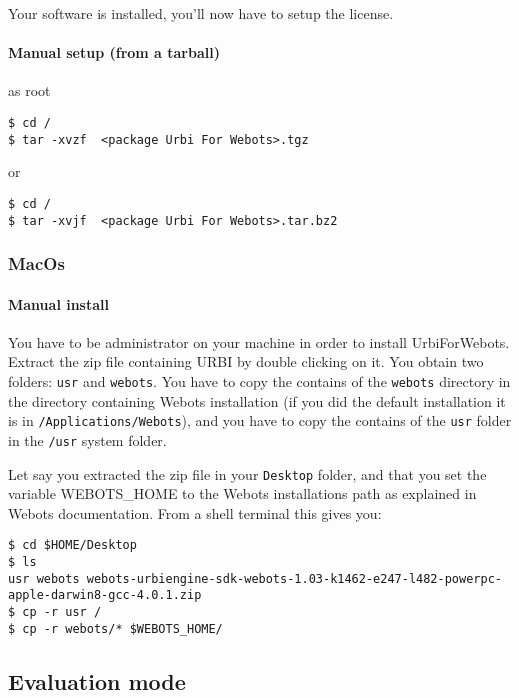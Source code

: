 Your software is installed, you'll now have to setup the license.


\paragraph{Manual setup (from a tarball)}
\label{webots.setup.linux.tarball}%
     as root

\begin{lstlisting}[firstnumber=1,]
$ cd /
$ tar -xvzf  <package Urbi For Webots>.tgz
\end{lstlisting}
     or

\begin{lstlisting}[firstnumber=1,]
$ cd /
$ tar -xvjf  <package Urbi For Webots>.tar.bz2
\end{lstlisting}

\subsubsection{MacOs}
\label{webots.setup.macos}%

\paragraph{Manual install}
\label{webots.setup.macos.manual}%

You have to be administrator on your machine in order to install
UrbiForWebots.  Extract the zip file containing URBI by double
clicking on it.  You obtain two folders: \nolinkurl{usr} and
\nolinkurl{webots}.  You have to copy the contains of the
\nolinkurl{webots} directory in the directory containing Webots
installation (if you did the default installation it is in
\nolinkurl{/Applications/Webots}), and you have to copy the contains
of the \nolinkurl{usr} folder in the \nolinkurl{/usr} system folder.


Let say you extracted the zip file in your \nolinkurl{Desktop} folder,
and that you set the variable WEBOTS\_HOME to the Webots installations
path as explained in Webots documentation.  From a shell terminal this
gives you:


\begin{lstlisting}[firstnumber=1,]
$ cd $HOME/Desktop
$ ls
usr webots webots-urbiengine-sdk-webots-1.03-k1462-e247-l482-powerpc-apple-darwin8-gcc-4.0.1.zip
$ cp -r usr /
$ cp -r webots/* $WEBOTS_HOME/
\end{lstlisting}

\subsection{Evaluation mode}
\label{webots.evaluation}%

